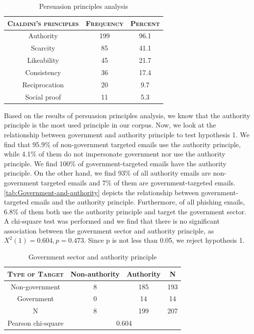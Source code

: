 \begin{table}[h]
\centering{}%
\begin{tabular}{ccc}
\toprule 
\textsc{\small{}Cialdini's principles} & \textsc{\small{}Frequency} & \textsc{\small{}Percent}\tabularnewline
\midrule
\midrule 
{\small{}Authority} & 199 & 96.1\tabularnewline
\midrule 
{\small{}Scarcity} & 85 & 41.1\tabularnewline
\midrule 
{\small{}Likeability} & 45 & 21.7\tabularnewline
\midrule 
Consistency & 36 & 17.4\tabularnewline
\midrule 
Reciprocation & 20 & 9.7\tabularnewline
\midrule 
Social proof & 11 & 5.3\tabularnewline
\bottomrule
\end{tabular}\protect\caption{\label{tab:Persuasion-principle-analysis}Persuasion principles analysis}
\end{table}


Based on the results of persuasion principles analysis, we know that
the authority principle is the most used principle in our corpus.
Now, we look at the relationship between government and authority
principle to test hypothesis 1. We find that 95.9\% of non-government
targeted emails use the authority principle, while 4.1\% of them do
not impersonate government nor use the authority principle. We find
100\% of government-targeted emails have the authority principle.
On the other hand, we find 93\% of all authority emails are non-government
targeted emails and 7\% of them are government-targeted emails. \autoref{tab:Government-and-authority}
depicts the relationship between government-targeted emails and the
authority principle. Furthermore, of all phishing emails, 6.8\% of
them both use the authority principle and target the government sector.
A chi-square test was performed and we find that there is no significant
association between the government sector and authority principle,
as $X^{2}(1)=0.604,p=0.473$. Since p is not less than 0.05, we reject
hypothesis 1.

\begin{minipage}[t]{1\columnwidth}%
\begin{longtable}{cccc}
\caption{\label{tab:Government-and-authority}Government sector and authority
principle}
\tabularnewline
\toprule 
\textsc{\footnotesize{}Type of Target} & {\footnotesize{}Non-authority} & {\footnotesize{}Authority} & \multirow{1}{*}{{\footnotesize{}N}}\tabularnewline
\midrule 
\multirow{1}{*}{{\footnotesize{}Non-government}} & {\footnotesize{}8} & {\footnotesize{}185} & \multirow{1}{*}{{\footnotesize{}193}}\tabularnewline
\midrule 
\multirow{1}{*}{{\footnotesize{}Government}} & {\footnotesize{}0} & {\footnotesize{}14} & \multirow{1}{*}{{\footnotesize{}14}}\tabularnewline
\midrule
\midrule 
{\footnotesize{}N} & {\footnotesize{}8} & {\footnotesize{}199} & {\footnotesize{}207}\tabularnewline
\midrule
\midrule 
{\footnotesize{}Pearson chi-square} & \multicolumn{3}{c}{{\footnotesize{}0.604}}\tabularnewline
\midrule
\end{longtable}%
\end{minipage}

